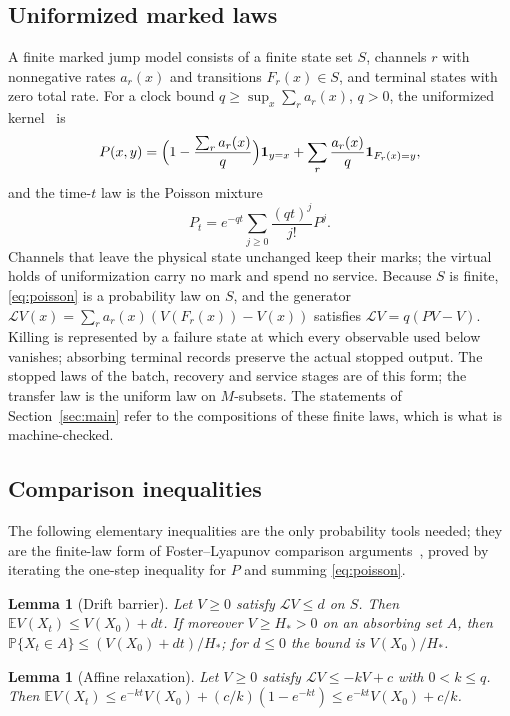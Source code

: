 \documentclass[11pt,a4paper]{article}
\theoremstyle{plain}
\newtheorem{lemma}[theorem]{Lemma}
\theoremstyle{definition}
\theoremstyle{remark}
\newcommand{\Prob}{\mathbb P}
\newcommand{\E}{\mathbb E}
\newcommand{\gen}{\mathcal L}
\newcommand{\ind}{\mathbf 1}
\begin{document}
\subsection{Uniformized marked laws}
A finite marked jump model consists of a finite state set $S$, channels $r$ with nonnegative rates $a_r(x)$ and transitions $F_r(x)\in S$, and terminal states with zero total rate. For a clock bound $q\ge\sup_x\sum_ra_r(x)$, $q>0$, the uniformized kernel~\citep{jensen1953} is
\begin{equation}\label{eq:kernel}
P(x,y)=\Bigl(1-\frac{\sum_ra_r(x)}q\Bigr)\ind_{y=x}+\sum_r\frac{a_r(x)}q\ind_{F_r(x)=y},
\end{equation}
and the time-$t$ law is the Poisson mixture
\begin{equation}\label{eq:poisson}
P_t=e^{-qt}\sum_{j\ge0}\frac{(qt)^j}{j!}P^j .
\end{equation}
Channels that leave the physical state unchanged keep their marks; the virtual holds of uniformization carry no mark and spend no service. Because $S$ is finite, \eqref{eq:poisson} is a probability law on $S$, and the generator $\gen V(x)=\sum_ra_r(x)(V(F_r(x))-V(x))$ satisfies $\gen V=q(PV-V)$. Killing is represented by a failure state at which every observable used below vanishes; absorbing terminal records preserve the actual stopped output. The stopped laws of the batch, recovery and service stages are of this form; the transfer law is the uniform law on $M$-subsets. The statements of Section~\ref{sec:main} refer to the compositions of these finite laws, which is what is machine-checked.

\subsection{Comparison inequalities}
The following elementary inequalities are the only probability tools needed; they are the finite-law form of Foster--Lyapunov comparison arguments~\citep{meyntweedie1993,gupta2014,kuntz2019}, proved by iterating the one-step inequality for $P$ and summing \eqref{eq:poisson}.

\begin{lemma}[Drift barrier]\label{lem:barrier}
Let $V\ge0$ satisfy $\gen V\le d$ on $S$. Then $\E V(X_t)\le V(X_0)+dt$. If moreover $V\ge H_*>0$ on an absorbing set $A$, then $\Prob\{X_t\in A\}\le(V(X_0)+dt)/H_*$; for $d\le0$ the bound is $V(X_0)/H_*$.
\end{lemma}

\begin{lemma}[Affine relaxation]\label{lem:affine}
Let $V\ge0$ satisfy $\gen V\le-kV+c$ with $0<k\le q$. Then $\E V(X_t)\le e^{-kt}V(X_0)+(c/k)(1-e^{-kt})\le e^{-kt}V(X_0)+c/k$.
\end{lemma}
\end{document}
